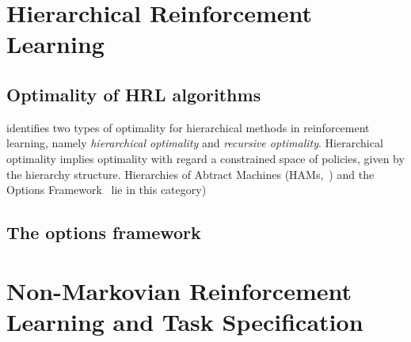 \section{Hierarchical Reinforcement Learning}
\subsection{Optimality of HRL algorithms}
\cite{Dietterich2000} identifies two types of optimality for hierarchical methods in reinforcement learning, namely \textit{hierarchical optimality} and \textit{recursive optimality}. Hierarchical optimality implies optimality with regard a constrained space of policies, given by the hierarchy structure. Hierarchies of Abtract Machines (HAMs,~\cite{Parr1997}) and the Options Framework~\citep{Sutton1999} lie in this category) 
\subsection{The options framework}
\label{section:options}

\section{Non-Markovian Reinforcement Learning and Task Specification}

